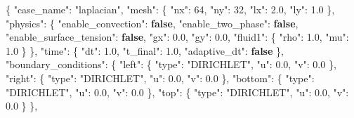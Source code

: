 \documentclass[
  french,
]{article}
\newenvironment{Shaded}{}{}
\newcommand{\DataTypeTok}[1]{\textcolor[rgb]{0.56,0.13,0.00}{#1}}
\newcommand{\DecValTok}[1]{\textcolor[rgb]{0.25,0.63,0.44}{#1}}
\newcommand{\FloatTok}[1]{\textcolor[rgb]{0.25,0.63,0.44}{#1}}
\newcommand{\FunctionTok}[1]{\textcolor[rgb]{0.02,0.16,0.49}{#1}}
\newcommand{\KeywordTok}[1]{\textcolor[rgb]{0.00,0.44,0.13}{\textbf{#1}}}
\newcommand{\StringTok}[1]{\textcolor[rgb]{0.25,0.44,0.63}{#1}}
\begin{document}
\begin{Shaded}
\begin{Highlighting}[]
\FunctionTok{\{}
  \DataTypeTok{"case\_name"}\FunctionTok{:} \StringTok{"laplacian"}\FunctionTok{,}
  \DataTypeTok{"mesh"}\FunctionTok{:} \FunctionTok{\{} \DataTypeTok{"nx"}\FunctionTok{:} \DecValTok{64}\FunctionTok{,} \DataTypeTok{"ny"}\FunctionTok{:} \DecValTok{32}\FunctionTok{,} \DataTypeTok{"lx"}\FunctionTok{:} \FloatTok{2.0}\FunctionTok{,} \DataTypeTok{"ly"}\FunctionTok{:} \FloatTok{1.0} \FunctionTok{\},}
  \DataTypeTok{"physics"}\FunctionTok{:} \FunctionTok{\{}
    \DataTypeTok{"enable\_convection"}\FunctionTok{:} \KeywordTok{false}\FunctionTok{,}
    \DataTypeTok{"enable\_two\_phase"}\FunctionTok{:} \KeywordTok{false}\FunctionTok{,}
    \DataTypeTok{"enable\_surface\_tension"}\FunctionTok{:} \KeywordTok{false}\FunctionTok{,}
    \DataTypeTok{"gx"}\FunctionTok{:} \FloatTok{0.0}\FunctionTok{,} \DataTypeTok{"gy"}\FunctionTok{:} \FloatTok{0.0}\FunctionTok{,}
    \DataTypeTok{"fluid1"}\FunctionTok{:} \FunctionTok{\{} \DataTypeTok{"rho"}\FunctionTok{:} \FloatTok{1.0}\FunctionTok{,} \DataTypeTok{"mu"}\FunctionTok{:} \FloatTok{1.0} \FunctionTok{\}}
  \FunctionTok{\},}
  \DataTypeTok{"time"}\FunctionTok{:} \FunctionTok{\{} \DataTypeTok{"dt"}\FunctionTok{:} \FloatTok{1.0}\FunctionTok{,} \DataTypeTok{"t\_final"}\FunctionTok{:} \FloatTok{1.0}\FunctionTok{,} \DataTypeTok{"adaptive\_dt"}\FunctionTok{:} \KeywordTok{false} \FunctionTok{\},}
  \DataTypeTok{"boundary\_conditions"}\FunctionTok{:} \FunctionTok{\{}
    \DataTypeTok{"left"}\FunctionTok{:}   \FunctionTok{\{} \DataTypeTok{"type"}\FunctionTok{:} \StringTok{"DIRICHLET"}\FunctionTok{,} \DataTypeTok{"u"}\FunctionTok{:} \FloatTok{0.0}\FunctionTok{,} \DataTypeTok{"v"}\FunctionTok{:} \FloatTok{0.0} \FunctionTok{\},}
    \DataTypeTok{"right"}\FunctionTok{:}  \FunctionTok{\{} \DataTypeTok{"type"}\FunctionTok{:} \StringTok{"DIRICHLET"}\FunctionTok{,} \DataTypeTok{"u"}\FunctionTok{:} \FloatTok{0.0}\FunctionTok{,} \DataTypeTok{"v"}\FunctionTok{:} \FloatTok{0.0} \FunctionTok{\},}
    \DataTypeTok{"bottom"}\FunctionTok{:} \FunctionTok{\{} \DataTypeTok{"type"}\FunctionTok{:} \StringTok{"DIRICHLET"}\FunctionTok{,} \DataTypeTok{"u"}\FunctionTok{:} \FloatTok{0.0}\FunctionTok{,} \DataTypeTok{"v"}\FunctionTok{:} \FloatTok{0.0} \FunctionTok{\},}
    \DataTypeTok{"top"}\FunctionTok{:}    \FunctionTok{\{} \DataTypeTok{"type"}\FunctionTok{:} \StringTok{"DIRICHLET"}\FunctionTok{,} \DataTypeTok{"u"}\FunctionTok{:} \FloatTok{0.0}\FunctionTok{,} \DataTypeTok{"v"}\FunctionTok{:} \FloatTok{0.0} \FunctionTok{\}}
  \FunctionTok{\},}

\end{Highlighting}
\end{Shaded}
\end{document}
